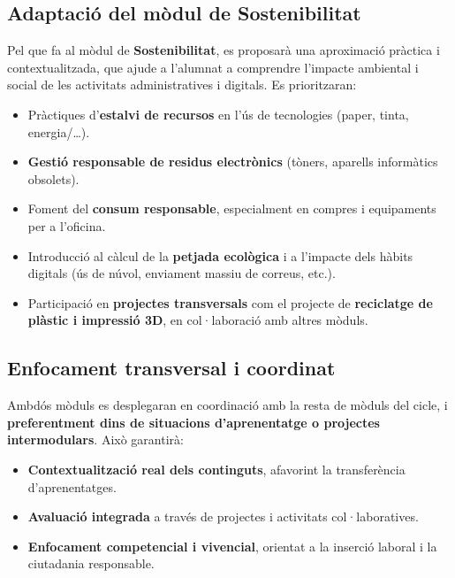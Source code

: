 \documentclass[
  paper=a4,
  ,captions=tableheading
]{scrartcl}
\providecommand{\tightlist}{%
  \setlength{\itemsep}{0pt}\setlength{\parskip}{0pt}}
\begin{document}
\hypertarget{adaptaciuxf3-del-muxf2dul-de-sostenibilitat}{%
\subsection{Adaptació del mòdul de
Sostenibilitat}\label{adaptaciuxf3-del-muxf2dul-de-sostenibilitat}}

Pel que fa al mòdul de \textbf{Sostenibilitat}, es proposarà una
aproximació pràctica i contextualitzada, que ajude a l'alumnat a
comprendre l'impacte ambiental i social de les activitats
administratives i digitals. Es prioritzaran:

\begin{itemize}
\tightlist
\item
  Pràctiques d'\textbf{estalvi de recursos} en l'ús de tecnologies
  (paper, tinta, energia/\ldots).
\item
  \textbf{Gestió responsable de residus electrònics} (tòners, aparells
  informàtics obsolets).
\item
  Foment del \textbf{consum responsable}, especialment en compres i
  equipaments per a l'oficina.
\item
  Introducció al càlcul de la \textbf{petjada ecològica} i a l'impacte
  dels hàbits digitals (ús de núvol, enviament massiu de correus, etc.).
\item
  Participació en \textbf{projectes transversals} com el projecte de
  \textbf{reciclatge de plàstic i impressió 3D}, en col·laboració amb
  altres mòduls.
\end{itemize}

\hypertarget{enfocament-transversal-i-coordinat}{%
\subsection{Enfocament transversal i
coordinat}\label{enfocament-transversal-i-coordinat}}

Ambdós mòduls es desplegaran en coordinació amb la resta de mòduls del
cicle, i \textbf{preferentment dins de situacions d'aprenentatge o
projectes intermodulars}. Això garantirà:

\begin{itemize}
\tightlist
\item
  \textbf{Contextualització real dels continguts}, afavorint la
  transferència d'aprenentatges.
\item
  \textbf{Avaluació integrada} a través de projectes i activitats
  col·laboratives.
\item
  \textbf{Enfocament competencial i vivencial}, orientat a la inserció
  laboral i la ciutadania responsable.
\end{itemize}
\end{document}
